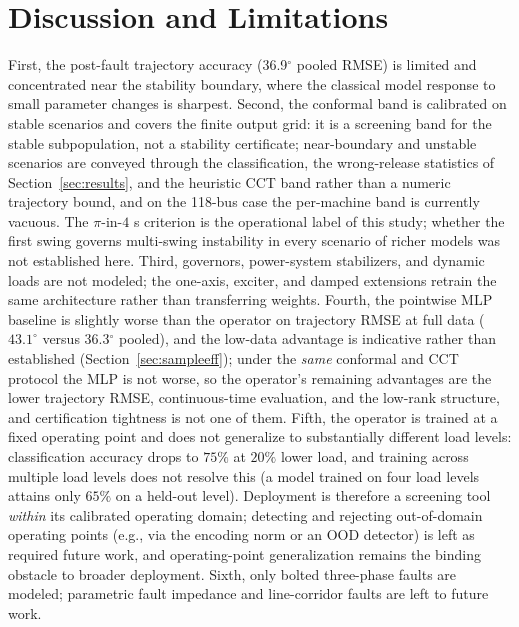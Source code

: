 \documentclass[5p,times]{elsarticle}
\newcommand{\rmsePost}{36.9}          %
\newcommand{\rmseAll}{36.3}           %
\begin{document}
\section{Discussion and Limitations}
\label{sec:discussion}
First, the post-fault trajectory accuracy (\rmsePost{}$^\circ$ pooled RMSE) is limited and
concentrated near the stability boundary, where the classical model response to small parameter
changes is sharpest. Second, the conformal band is calibrated on stable scenarios and covers the
finite output grid: it is a screening band for the stable subpopulation, not a stability
certificate; near-boundary and unstable scenarios are conveyed through the classification, the
wrong-release statistics of Section~\ref{sec:results}, and the heuristic CCT band rather than a
numeric trajectory bound, and on the 118-bus case the per-machine band is currently vacuous. The $\pi$-in-$4$ s criterion is the operational label of this study; whether the first
swing governs multi-swing instability in every scenario of richer models was not established
here. Third, governors, power-system stabilizers, and dynamic loads are not modeled; the one-axis,
exciter, and damped extensions retrain the same architecture rather than transferring weights. Fourth, the pointwise
MLP baseline is slightly worse than the operator on trajectory RMSE at full data
($43.1^\circ$ versus \rmseAll{}$^\circ$ pooled), and the low-data advantage is indicative rather
than established (Section~\ref{sec:sampleeff}); under the \emph{same} conformal and CCT protocol
the MLP is not worse, so the operator's remaining advantages are the lower trajectory RMSE,
continuous-time evaluation, and the low-rank structure, and certification tightness is not one of
them. Fifth, the operator is trained at a fixed operating point and does not generalize to
substantially different load levels: classification accuracy drops to $75\%$ at $20\%$ lower
load, and training across multiple load levels does not resolve this (a model trained on four
load levels attains only $65\%$ on a held-out level). Deployment is therefore a screening tool
\emph{within} its calibrated operating domain; detecting and rejecting out-of-domain operating
points (e.g., via the encoding norm or an OOD detector) is left as required future work, and
operating-point generalization remains the binding obstacle to broader deployment. Sixth, only bolted three-phase faults are
modeled; parametric fault impedance and line-corridor faults are left to future work.
\end{document}
